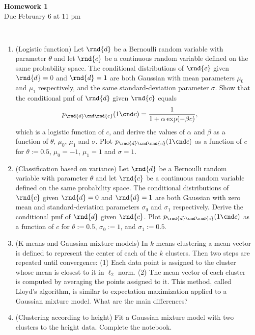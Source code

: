 \documentclass[12pt,twoside]{article}
\begin{document}
\begin{center}
{\large{\textbf{Homework 1}} } \vspace{0.2cm}\\
Due February 6 at 11 pm
\\
\end{center}
\\

\begin{enumerate}

\item (Logistic function) Let $\rnd{d}$ be a Bernoulli random variable with parameter $\theta$ and let $\rnd{c}$ be a continuous random variable defined on the same probability space. The conditional distributions of $\rnd{c}$ given $\rnd{d}=0$ and $\rnd{d}=1$ are both Gaussian with mean parameters $\mu_0$ and $\mu_1$ respectively, and the same standard-deviation parameter $\sigma$. Show that the conditional pmf of $\rnd{d}$ given $\rnd{c}$ equals 
\begin{align}
p_{\rnd{d} \cnd \rnd{c}}(1 \cnd c) &  = \frac{1}{1 + \alpha \exp( - \beta c) },
\end{align} 
which is a logistic function of $c$, and derive the values of $\alpha$ and $\beta$ as a function of $\theta$, $\mu_0$, $\mu_1$ and $\sigma$. Plot $p_{\rnd{d} \cnd \rnd{c}}(1 \cnd c) $ as a function of $c$ for $\theta:=0.5$, $\mu_0=-1$, $\mu_1=1$ and $\sigma=1$.

\item (Classification based on variance) Let $\rnd{d}$ be a Bernoulli random variable with parameter $\theta$ and let $\rnd{c}$ be a continuous random variable defined on the same probability space. The conditional distributions of $\rnd{c}$ given $\rnd{d}=0$ and $\rnd{d}=1$ are both Gaussian with zero mean and standard-deviation parameters $\sigma_0$ and $\sigma_1$ respectively. Derive the conditional pmf of $\rnd{d}$ given $\rnd{c}$. Plot $p_{\rnd{d} \cnd \rnd{c}}(1 \cnd c) $ as a function of $c$ for $\theta:=0.5$, $\sigma_0:=1$, and $\sigma_1:=0.5$.

\item (K-means and Gaussian mixture models) In $k$-means clustering a mean vector is defined to represent the center of each of the $k$ clusters. Then two steps are repeated until convergence: (1) Each data point is assigned to the cluster whose mean is closest to it in $\ell_2$ norm. (2) The mean vector of each cluster is computed by averaging the points assigned to it. This method, called Lloyd's algorithm, is similar to expectation maximization applied to a Gaussian mixture model. What are the main differences?  

\item (Clustering according to height) Fit a Gaussian mixture model with two clusters to the height data. Complete the notebook.

 \end{enumerate}
 
\end{document}

